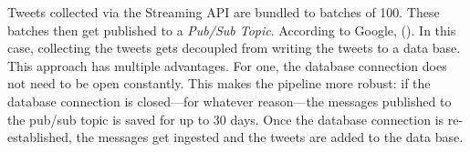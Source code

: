 Tweets collected via the Streaming API are bundled to batches of 100. These batches then get published to a \emph{Pub/Sub Topic}. According to Google,  (\cite{google_what_2020}). In this case, collecting the tweets gets decoupled from writing the tweets to a data base. This approach has multiple advantages. For one, the database connection does not need to be open constantly. This makes the pipeline more robust: if the database connection is closed---for whatever reason---the messages published to the pub/sub topic is saved for up to 30 days. Once the database connection is re-established, the messages get ingested and the tweets are added to the data base. 